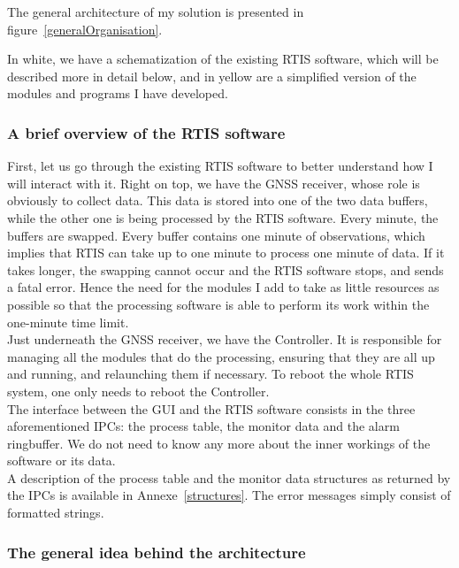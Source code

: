 \documentclass{themeensg}
\begin{document}
The general architecture of my solution is presented in figure~\ref{generalOrganisation}.

In white, we have a schematization of the existing RTIS software, which will be described more in detail below, and in yellow are a simplified version of the modules and programs I have developed.

\subsubsection{A brief overview of the RTIS software}

First, let us go through the existing RTIS software to better understand how I will interact with it. Right on top, we have the GNSS receiver, whose role is obviously to collect data. This data is stored into one of the two data buffers, while the other one is being processed by the RTIS software. Every minute, the buffers are swapped. Every buffer contains one minute of observations, which implies that RTIS can take up to one minute to process one minute of data. If it takes longer, the swapping cannot occur and the RTIS software stops, and sends a fatal error. Hence the need for the modules I add to take as little resources as possible so that the processing software is able to perform its work within the one-minute time limit.\\

Just underneath the GNSS receiver, we have the Controller. It is responsible for managing all the modules that do the processing, ensuring that they are all up and running, and relaunching them if necessary. To reboot the whole RTIS system, one only needs to reboot the Controller.\\

The interface between the GUI and the RTIS software consists in the three aforementioned IPCs: the process table, the monitor data and the alarm ringbuffer. We do not need to know any more about the inner workings of the software or its data.\\

A description of the process table and the monitor data structures as returned by the IPCs is available in Annexe~\ref{structures}. The error messages simply consist of formatted strings.

\subsubsection{The general idea behind the architecture}
\end{document}
